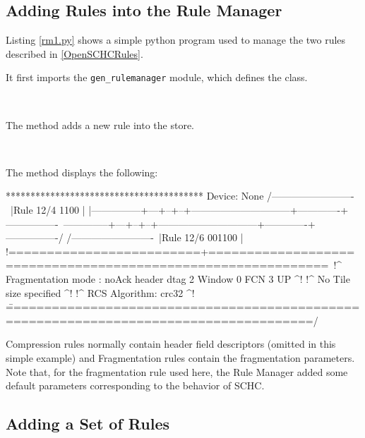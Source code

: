 \subsection{Adding Rules into the Rule Manager}\label{RuleDefinition}

Listing \ref{rm1.py} shows a simple python program used to manage the two rules described in \ref{OpenSCHCRules}. 


It first imports the \texttt{gen\_rulemanager} module, which defines the \texttt{} class. 

~~


The \texttt{} method adds a new rule into the store.

~~~

The  method displays the following:

\begin{termc}[backgroundcolor=\color{palerod}, basicstyle=\ttfamily\tiny, escapechar=@]
****************************************
Device: None
/-------------------------\
|Rule 12/4          1100  |
|---------------+---+--+--+------------------------------+-------------+----------------\
\---------------+---+--+--+------------------------------+-------------+----------------/
/-------------------------\
|Rule 12/6        001100  |
!=========================+=============================================================\
!^ Fragmentation mode : noAck    header dtag 2 Window  0 FCN  3                     UP ^!
!^ No Tile size specified                                                              ^!
!^ RCS Algorithm: crc32                                                                ^!
\=======================================================================================/
\end{termc}

Compression rules normally contain header field descriptors (omitted in this simple example) and Fragmentation rules contain the fragmentation parameters. Note that, for the fragmentation rule used here, the Rule Manager added some default parameters corresponding to the  behavior of SCHC.



\subsection{Adding a Set of Rules}

